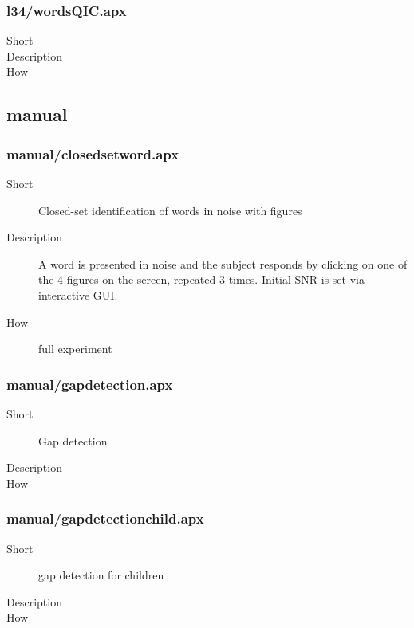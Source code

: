 \subsubsection{l34/wordsQIC.apx}
\begin{description}
\item[Short] 

\item[Description] 

\item[How] 

\end{description}

\subsection{manual}
\subsubsection{manual/closedsetword.apx}
\begin{description}
\item[Short] 
 Closed-set identification of words in noise with figures
\item[Description] 
 A word is presented in noise and the subject responds by clicking on one of the 4 figures on the screen, repeated 3 times. Initial SNR is set via interactive GUI.
\item[How] 
 full experiment
\end{description}

\subsubsection{manual/gapdetection.apx}
\begin{description}
\item[Short] 
 Gap detection
\item[Description] 

\item[How] 

\end{description}

\subsubsection{manual/gapdetectionchild.apx}
\begin{description}
\item[Short] 
 gap detection for children
\item[Description] 

\item[How] 

\end{description}

